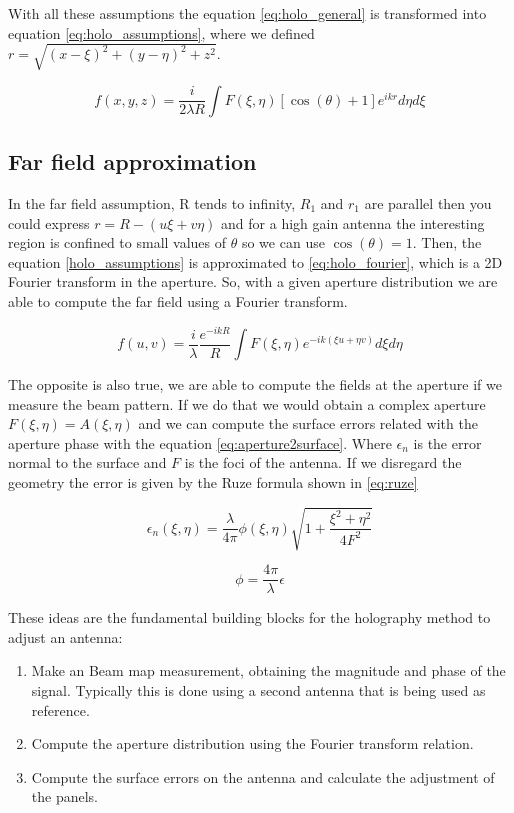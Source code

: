With all these assumptions the equation \ref{eq:holo_general} is transformed into equation \ref{eq:holo_assumptions}, where we defined $r= \sqrt{(x-\xi)^2+(y-\eta)^2+z^2}$.

\begin{equation}
f(x,y,z) = \frac{i}{2\lambda R}\int F(\xi,\eta)[\cos(\theta)+1]e^{ikr}d\eta d\xi
    \label{eq:holo_assumptions}
\end{equation}


\subsection{Far field approximation}
In the far field assumption, R tends to infinity, $R_1$ and $r_1$ are parallel then you could express $r=R-(u\xi+v\eta)$ and for a high gain antenna the interesting region is confined to small values of $\theta$ so we can  use $\cos(\theta)=1$. Then,  the equation \ref{holo_assumptions} is approximated to \ref{eq:holo_fourier}, which is a 2D Fourier transform in the aperture. So, with a given aperture distribution we are able to compute the far field using a Fourier transform. 


\begin{equation}
    f(u,v) = \frac{i}{\lambda}\frac{e^{-ikR}}{R} \int F(\xi,\eta)e^{-ik(\xi u+\eta v)} d\xi d\eta
    \label{eq:holo_fourier}
\end{equation}


The opposite is also true, we are able to compute the fields at the aperture if we measure the beam pattern. If we do that we would obtain a complex aperture $F(\xi, \eta)=A(\xi, \eta)$ and we can compute the surface errors related with the aperture phase with the equation \ref{eq:aperture2surface}. Where $\epsilon_n$ is the error normal to the surface and $F$ is the foci of the antenna. If we disregard the geometry the error is given by the Ruze formula shown in \ref{eq:ruze}

\begin{equation}
    \epsilon_n(\xi,\eta) = \frac{\lambda}{4\pi} \phi(\xi,\eta)\sqrt{1+\frac{\xi^2+\eta^2}{4F^2}}
    \label{eq:aperture2surface}
\end{equation}


\begin{equation}
    \phi = \frac{4\pi}{\lambda}\epsilon
    \label{eq:ruze}
\end{equation}


These ideas are the fundamental building blocks for the holography method to adjust an antenna:
\begin{enumerate}
    \item Make an Beam map measurement, obtaining the magnitude and phase of the signal. Typically this is done using a second antenna that is being used as reference.
    \item Compute the aperture distribution using the Fourier transform relation.
    \item Compute the surface errors on the antenna and calculate the adjustment of the panels.
\end{enumerate}


